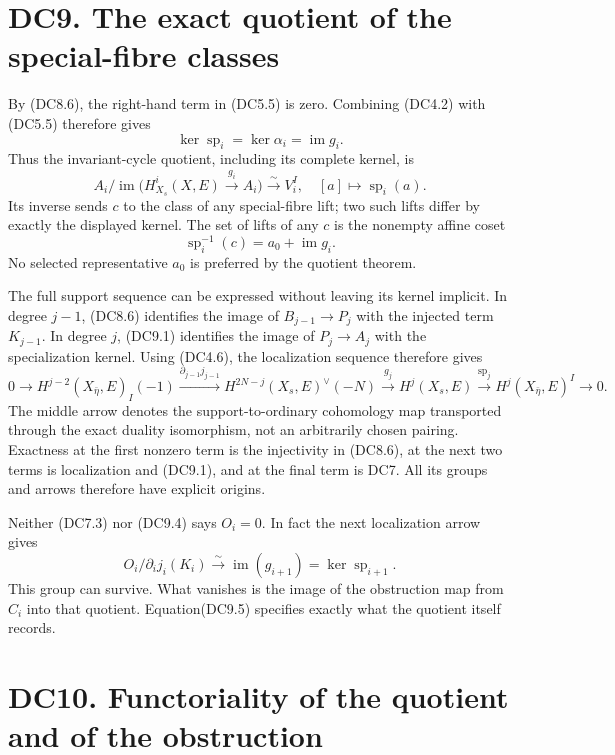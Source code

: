 \documentclass[
]{report}
\newcounter{none} %
\begin{document}
\section{DC9. The exact quotient of the special-fibre
classes}\label{dc9.-the-exact-quotient-of-the-special-fibre-classes}

By (DC8.6), the right-hand term in (DC5.5) is zero. Combining (DC4.2)
with (DC5.5) therefore gives \[
\ker\operatorname{sp}_i=\ker\alpha_i=\operatorname{im}g_i.
\tag{DC9.1}
\] Thus the invariant-cycle quotient, including its complete kernel, is
\[
A_i/\operatorname{im}\bigl(H^i_{X_s}(X,E)\xrightarrow{g_i}A_i\bigr)
 \xrightarrow{\sim}V_i^I,
\quad [a]\longmapsto\operatorname{sp}_i(a).
\tag{DC9.2}
\] Its inverse sends \(c\) to the class of any special-fibre lift; two
such lifts differ by exactly the displayed kernel. The set of lifts of
any \(c\) is the nonempty affine coset \[
\operatorname{sp}_i^{-1}(c)=a_0+\operatorname{im}g_i.
\tag{DC9.3}
\] No selected representative \(a_0\) is preferred by the quotient
theorem.

The full support sequence can be expressed without leaving its kernel
implicit. In degree \(j-1\), (DC8.6) identifies the image of
\(B_{j-1}\to P_j\) with the injected term \(K_{j-1}\). In degree \(j\),
(DC9.1) identifies the image of \(P_j\to A_j\) with the specialization
kernel. Using (DC4.6), the localization sequence therefore gives \[
0\longrightarrow H^{j-2}(X_{\bar\eta},E)_I(-1)
 \xrightarrow{\partial_{j-1}j_{j-1}}
 H^{2N-j}(X_s,E)^\vee(-N)
 \xrightarrow{g_j}H^j(X_s,E)
 \xrightarrow{\operatorname{sp}_j}H^j(X_{\bar\eta},E)^I
 \longrightarrow0.
\tag{DC9.4}
\] The middle arrow denotes the support-to-ordinary cohomology map
transported through the exact duality isomorphism, not an arbitrarily
chosen pairing. Exactness at the first nonzero term is the injectivity
in (DC8.6), at the next two terms is localization and (DC9.1), and at
the final term is DC7. All its groups and arrows therefore have explicit
origins.

Neither (DC7.3) nor (DC9.4) says \(O_i=0\). In fact the next
localization arrow gives \[
O_i/\partial_i j_i(K_i)
 \xrightarrow{\sim}\operatorname{im}(g_{i+1})
 =\ker\operatorname{sp}_{i+1}.
\tag{DC9.5}
\] This group can survive. What vanishes is the image of the obstruction
map from \(C_i\) into that quotient. Equation(DC9.5) specifies exactly
what the quotient itself records.

\section{DC10. Functoriality of the quotient and of the
obstruction}\label{dc10.-functoriality-of-the-quotient-and-of-the-obstruction}
\end{document}
